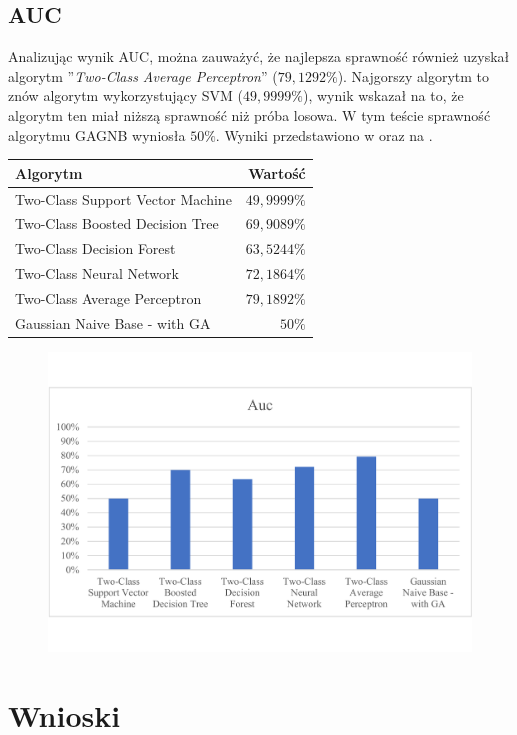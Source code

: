 \subsection{AUC}
Analizując wynik AUC, można zauważyć, że najlepsza sprawność również uzyskał algorytm ''\textit{Two-Class Average Perceptron}'' ($79,1292\%$). Najgorszy algorytm to znów algorytm wykorzystujący SVM ($49,9999\%$), wynik wskazał na to, że algorytm ten miał niższą sprawność niż próba losowa. W tym teście sprawność algorytmu GAGNB wyniosła $50\%$. Wyniki przedstawiono w  oraz na .

\begin{table}[H]
    \centering
    \begin{tabular}{|l|r|} \hline
    \textbf{Algorytm} & \textbf{Wartość} \\ \hline
    Two-Class Support Vector Machine & $49,9999\%$ \\ \hline
    Two-Class Boosted Decision Tree & $69,9089\%$ \\ \hline
    Two-Class Decision Forest & $63,5244\%$ \\ \hline
    Two-Class Neural Network & $72,1864\%$ \\ \hline
    Two-Class Average Perceptron & $79,1892\%$ \\ \hline
    Gaussian Naive Base - with GA & $50\%$ \\ \hline
    \end{tabular}
    \label{tab:acc-auc}
\end{table}

\begin{figure}[H]
    \centering
    \includegraphics[width=\textwidth]{images/auc-res}
    \label{fig:auc-res}
\end{figure}

\section{Wnioski}

